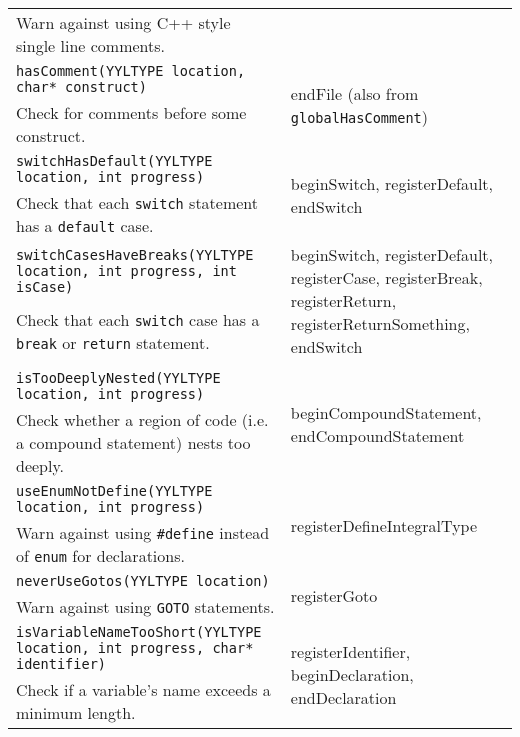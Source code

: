 \documentclass[12pt]{report}
\begin{document}
\begin{longtable}{p{10cm} p{\saxColSize}}
		Warn against using C++ style single line comments. \vspace{\vertSize} \\
		\lstinline!hasComment(YYLTYPE location, char* construct)!  & \multirow{2}{\saxColSize}{endFile (also from \lstinline!globalHasComment!)} \\*
			 Check for comments before some construct. \vspace{\vertSize} \\
		\lstinline!switchHasDefault(YYLTYPE location, int progress)! & \multirow{2}{\saxColSize}{beginSwitch, registerDefault, endSwitch} \\*
		 Check that each \lstinline!switch! statement has a \lstinline!default! case. \vspace{\vertSize} \\
		\lstinline!switchCasesHaveBreaks(YYLTYPE location, int progress, int isCase)! & \multirow{2}{\saxColSize}{beginSwitch, registerDefault, registerCase, registerBreak, registerReturn, registerReturnSomething, endSwitch} \\*
		 Check that each \lstinline!switch! case has a \lstinline!break! or \lstinline!return! statement. \vspace{\vertSize} \\ \\
		\lstinline!isTooDeeplyNested(YYLTYPE location, int progress)! & \multirow{2}{\saxColSize}{beginCompoundStatement, endCompoundStatement} \\*
		 Check whether a region of code (i.e. a compound statement) nests too deeply. \vspace{\vertSize} \\
		\lstinline!useEnumNotDefine(YYLTYPE location, int progress)! & \multirow{2}{\saxColSize}{registerDefineIntegralType} \\*
			 Warn against using \lstinline!#define! instead of \lstinline!enum! for declarations. \vspace{\vertSize} \\
		\lstinline!neverUseGotos(YYLTYPE location)! & \multirow{2}{\saxColSize}{registerGoto} \\*
			 Warn against using \lstinline!GOTO! statements. \vspace{\vertSize} \\
		\lstinline!isVariableNameTooShort(YYLTYPE location, int progress, char* identifier)! & \multirow{2}{\saxColSize}{registerIdentifier, beginDeclaration, endDeclaration} \\*
		 Check if a variable's name exceeds a minimum length. \vspace{\vertSize} \\

\end{longtable}
\end{document}
